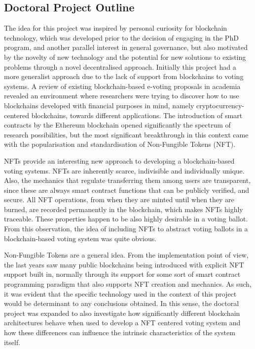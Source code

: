 \documentclass[../main.tex]{subfiles}
\begin{document}
\subsection{Doctoral Project Outline}
The idea for this project was inspired by personal curiosity for blockchain technology, which was developed prior to the decision of engaging in the PhD program, and another parallel interest in general governance, but also motivated by the novelty of new technology and the potential for new solutions to existing problems through a novel decentralised approach. Initially this project had a more generalist approach due to the lack of support from blockchains to voting systems. A review of existing blockchain-based e-voting proposals in academia revealed an environment where researchers were trying to discover how to use blockchains developed with financial purposes in mind, namely cryptocurrency-centered blockchains, towards different applications. The introduction of smart contracts by the Ethereum blockchain opened significantly the spectrum of research possibilities, but the most significant breakthrough in this context came with the popularisation and standardisation of Non-Fungible Tokens (NFT).
\par
NFTs provide an interesting new approach to developing a blockchain-based voting systems. NFTs are inherently scarce, indivisible and individually unique. Also, the mechanics that regulate transferring them among users are transparent, since these are always smart contract functions that can be publicly verified, and secure. All NFT operations, from when they are minted until when they are burned, are recorded permanently in the blockchain, which makes NFTs highly traceable. These properties happen to be also highly desirable in a voting ballot. From this observation, the idea of including NFTs to abstract voting ballots in a blockchain-based voting system was quite obvious.
\par
Non-Fungible Tokens are a general idea. From the implementation point of view, the last years saw many public blockchains being introduced with explicit NFT support built in, normally through its support for some sort of smart contract programming paradigm that also supports NFT creation and mechanics. As such, it was evident that the specific technology used in the context of this project would be determinant to any conclusions obtained. In this sense, the doctoral project was expanded to also investigate how significantly different blockchain architectures behave when used to develop a NFT centered voting system and how these differences can influence the intrinsic characteristics of the system itself.
\end{document}
